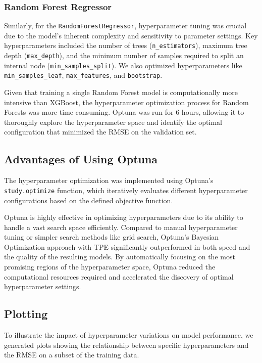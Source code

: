 \documentclass[12pt]{article}
\begin{document}
\subsubsection{Random Forest Regressor}

Similarly, for the \texttt{RandomForestRegressor}, hyperparameter tuning was crucial due to the model's inherent complexity and sensitivity to parameter settings. Key hyperparameters included the number of trees (\texttt{n\_estimators}), maximum tree depth (\texttt{max\_depth}), and the minimum number of samples required to split an internal node (\texttt{min\_samples\_split}). We also optimized hyperparameters like \texttt{min\_samples\_leaf}, \texttt{max\_features}, and \texttt{bootstrap}.

Given that training a single Random Forest model is computationally more intensive than XGBoost, the hyperparameter optimization process for Random Forests was more time-consuming. Optuna was run for 6 hours, allowing it to thoroughly explore the hyperparameter space and identify the optimal configuration that minimized the RMSE on the validation set.

\subsection{Advantages of Using Optuna}

The hyperparameter optimization was implemented using Optuna's \texttt{study.optimize} function, which iteratively evaluates different hyperparameter configurations based on the defined objective function.

Optuna is highly effective in optimizing hyperparameters due to its ability to handle a vast search space efficiently. Compared to manual hyperparameter tuning or simpler search methods like grid search, Optuna's Bayesian Optimization approach with TPE significantly outperformed in both speed and the quality of the resulting models. By automatically focusing on the most promising regions of the hyperparameter space, Optuna reduced the computational resources required and accelerated the discovery of optimal hyperparameter settings.

\subsection{Plotting}

To illustrate the impact of hyperparameter variations on model performance, we generated plots showing the relationship between specific hyperparameters and the RMSE on a subset of the training data.
\end{document}
